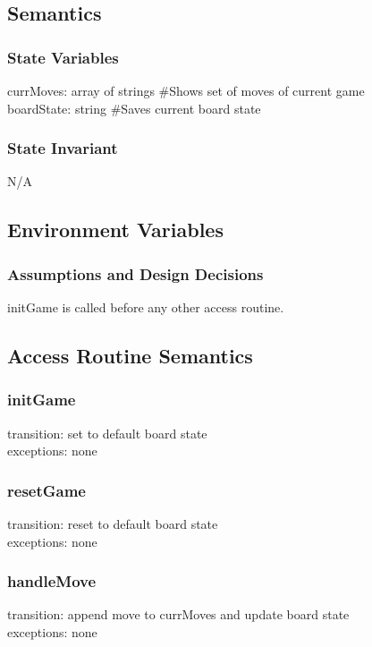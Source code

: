 \documentclass[12pt, titlepage]{article}
\begin{document}
    \subsection*{Semantics}
        \subsubsection*{State Variables}
            currMoves: array of strings \#Shows set of moves of current game\\
            boardState: string \#Saves current board state
            
        \subsubsection*{State Invariant}
            N/A
            
    \subsection*{Environment Variables}
            
        \subsubsection*{Assumptions and Design Decisions}
            initGame is called before any other access routine.
            
    \subsection*{Access Routine Semantics}
    
        \subsubsection*{initGame}
            transition: set to default board state \\ 
            exceptions: none
    
        \subsubsection*{resetGame}
            transition: reset to default board state \\
            exceptions: none
            
        \subsubsection*{handleMove}
            transition: append move to currMoves and update board state \\ 
            exceptions: none
        
\end{document}
